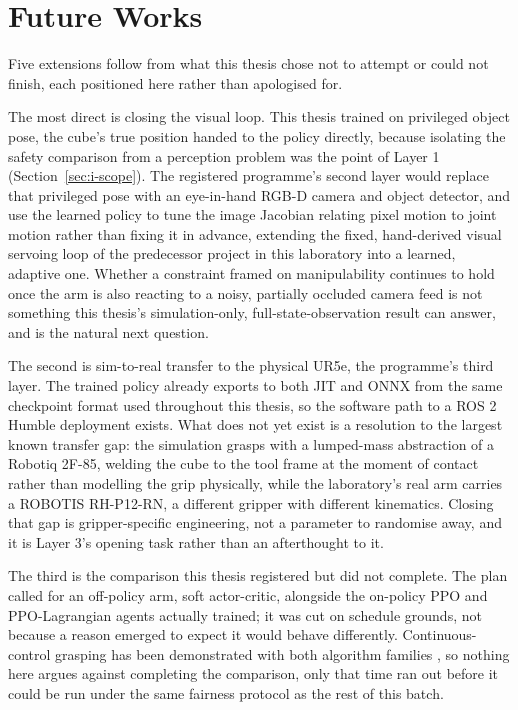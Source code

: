 \section{Future Works}\label{sec:c-future}

Five extensions follow from what this thesis chose not to attempt or could not finish, each
positioned here rather than apologised for.

The most direct is closing the visual loop. This thesis trained on privileged object pose, the
cube's true position handed to the policy directly, because isolating the safety comparison from a
perception problem was the point of Layer 1 (Section~\ref{sec:i-scope}). The registered
programme's second layer would replace that privileged pose with an eye-in-hand RGB-D camera and
object detector, and use the learned policy to tune the image Jacobian relating pixel motion to
joint motion rather than fixing it in advance, extending the fixed, hand-derived visual servoing
loop of the predecessor project in this laboratory \cite{khan2025csrt_ibvs} into a learned,
adaptive one. Whether a constraint framed on manipulability continues to hold once the arm is also
reacting to a noisy, partially occluded camera feed is not something this thesis's
simulation-only, full-state-observation result can answer, and is the natural next question.

The second is sim-to-real transfer to the physical UR5e, the programme's third layer. The trained
policy already exports to both JIT and ONNX from the same checkpoint format used throughout this
thesis, so the software path to a ROS 2 Humble deployment exists. What does not yet exist is a
resolution to the largest known transfer gap: the simulation grasps with a lumped-mass abstraction
of a Robotiq 2F-85, welding the cube to the tool frame at the moment of contact rather than
modelling the grip physically, while the laboratory's real arm carries a ROBOTIS RH-P12-RN, a
different gripper with different kinematics. Closing that gap is gripper-specific engineering, not
a parameter to randomise away, and it is Layer 3's opening task rather than an afterthought to it.

The third is the comparison this thesis registered but did not complete. The plan called for an
off-policy arm, soft actor-critic, alongside the on-policy PPO and PPO-Lagrangian agents actually
trained; it was cut on schedule grounds, not because a reason emerged to expect it would behave
differently. Continuous-control grasping has been demonstrated with both algorithm families
\cite{shahid2022continuous_grasping}, so nothing here argues against completing the comparison,
only that time ran out before it could be run under the same fairness protocol as the rest of this
batch.

